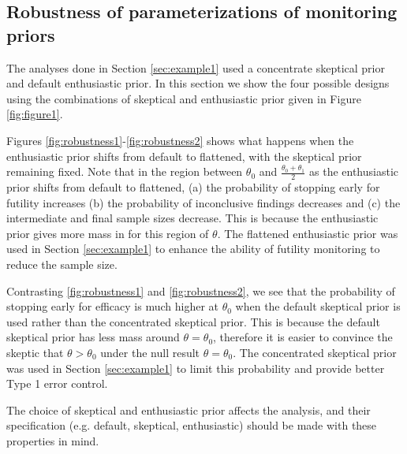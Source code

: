 \documentclass[12pt]{article}
\begin{document}
\subsection{Robustness of parameterizations of monitoring priors}\label{sec:priorRobustness}
The analyses done in Section \ref{sec:example1} used a concentrate skeptical prior and default enthusiastic prior. In this section we show the four possible designs using the combinations of skeptical and enthusiastic prior given in Figure \ref{fig:figure1}.

Figures \ref{fig:robustness1}-\ref{fig:robustness2} shows what happens when the enthusiastic prior shifts from default to flattened, with the skeptical prior remaining fixed. Note that in the region between $\theta_0$ and $\frac{\theta_0+\theta_1}{2}$ as the enthusiastic prior shifts from default to flattened, (a) the probability of stopping early for futility increases (b) the probability of inconclusive findings decreases and (c) the intermediate and final sample sizes decrease. This is because the enthusiastic prior gives more mass in for this region of $\theta$. The flattened enthusiastic prior was used in Section \ref{sec:example1} to enhance the ability of futility monitoring to reduce the sample size.

Contrasting \ref{fig:robustness1} and \ref{fig:robustness2}, we see that the probability of stopping early for efficacy is much higher at $\theta_0$ when the default skeptical prior is used rather than the concentrated skeptical prior. This is because the default skeptical prior has less mass around $\theta=\theta_0$, therefore it is easier to convince the skeptic that $\theta>\theta_0$ under the null result $\theta=\theta_0$. The concentrated skeptical prior was used in Section \ref{sec:example1} to limit this probability and provide better Type 1 error control.

The choice of skeptical and enthusiastic prior affects the analysis, and their specification (e.g. default, skeptical, enthusiastic) should be made with these properties in mind.
\end{document}
